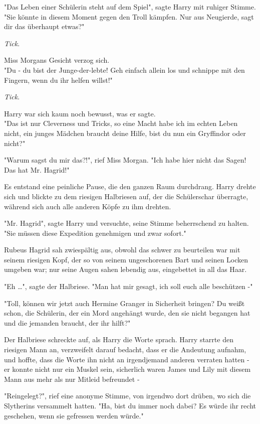 {"Das Leben einer Schülerin steht auf dem Spiel", sagte Harry mit ruhiger Stimme. "Sie könnte in diesem Moment gegen den Troll kämpfen. Nur aus Neugierde, sagt dir das überhaupt etwas?"

\emph{Tick}.

Miss Morgans Gesicht verzog sich.\\ "Du - du bist der Junge-der-lebte! Geh einfach allein los und schnippe mit den Fingern, wenn du ihr helfen willst!"

\emph{Tick}.

Harry war sich kaum noch bewusst, was er sagte.\\ "Das ist nur Cleverness und Tricks, so eine Macht habe ich im echten Leben nicht, ein junges Mädchen braucht deine Hilfe, bist du nun ein Gryffindor oder nicht?"

"Warum sagst du mir das?!", rief Miss Morgan. "Ich habe hier nicht das Sagen! Das hat Mr. Hagrid!"

Es entstand eine peinliche Pause, die den ganzen Raum durchdrang. Harry drehte sich und blickte zu dem riesigen Halbriesen auf, der die Schülerschar überragte, während sich auch alle anderen Köpfe zu ihm drehten.

"Mr. Hagrid", sagte Harry und versuchte, seine Stimme beherrschend zu halten. "Sie müssen diese Expedition genehmigen und zwar sofort."

Rubeus Hagrid sah zwiespältig aus, obwohl das schwer zu beurteilen war mit seinem riesigen Kopf, der so von seinem ungeschorenen Bart und seinen Locken umgeben war; nur seine Augen sahen lebendig aus, eingebettet in all das Haar.

"Eh …", sagte der Halbriese. "Man hat mir gesagt, ich soll euch alle beschützen -"

"Toll, können wir jetzt auch Hermine Granger in Sicherheit bringen? Du weißt schon, die Schülerin, der ein Mord angehängt wurde, den sie nicht begangen hat und die jemanden braucht, der ihr hilft?"

Der Halbriese schreckte auf, als Harry die Worte sprach. Harry starrte den riesigen Mann an, verzweifelt darauf bedacht, dass er die Andeutung aufnahm, und hoffte, dass die Worte ihn nicht an irgendjemand anderen verraten hatten - er konnte nicht nur ein Muskel sein, sicherlich waren James und Lily mit diesem Mann aus mehr als nur Mitleid befreundet -

"Reingelegt?", rief eine anonyme Stimme, von irgendwo dort drüben, wo sich die Slytherins versammelt hatten. "Ha, bist du immer noch dabei? Es würde ihr recht geschehen, wenn sie gefressen werden würde."

}
